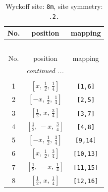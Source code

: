 \documentclass[fleqn,8pt]{jsarticle}
\begin{document}
\begin{longtable}{ccc}
\caption{Wyckoff site: {\tt 8m}, site symmetry: {\tt .2.}}
 \\
 \hline \hline
No. & position & mapping \\ \hline \endfirsthead

\multicolumn{2}{l}{\tablename\ \thetable{}} \\
 \hline \hline
No. & position & mapping \\ \hline \endhead

 \hline \hline
\multicolumn{2}{r}{\footnotesize\it continued ...} \\ \endfoot

 \hline \hline
\multicolumn{2}{r}{} \\ \endlastfoot

1 & $\left[ x,\, \frac{1}{2},\, \frac{1}{4} \right]$ & {\tt [1,6]} \\ \hline
2 & $\left[ - x,\, \frac{1}{2},\, \frac{1}{4} \right]$ & {\tt [2,5]} \\ \hline
3 & $\left[ \frac{1}{2},\, x,\, \frac{3}{4} \right]$ & {\tt [3,7]} \\ \hline
4 & $\left[ \frac{1}{2},\, - x,\, \frac{3}{4} \right]$ & {\tt [4,8]} \\ \hline
5 & $\left[ - x,\, \frac{1}{2},\, \frac{3}{4} \right]$ & {\tt [9,14]} \\ \hline
6 & $\left[ x,\, \frac{1}{2},\, \frac{3}{4} \right]$ & {\tt [10,13]} \\ \hline
7 & $\left[ \frac{1}{2},\, - x,\, \frac{1}{4} \right]$ & {\tt [11,15]} \\ \hline
8 & $\left[ \frac{1}{2},\, x,\, \frac{1}{4} \right]$ & {\tt [12,16]} \\
\end{longtable}
\renewcommand{\arraystretch}{1.2}
\end{document}
